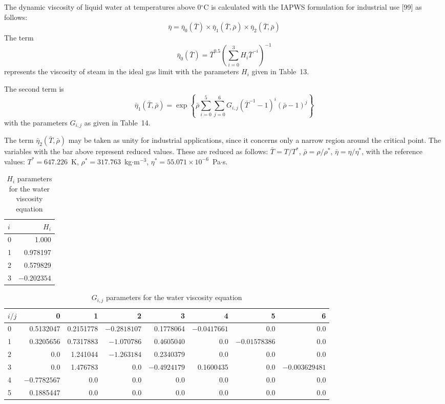 \documentclass[11pt]{article}
\begin{document}
The dynamic viscosity of liquid water at temperatures above 0$^{\circ}$C is calculated
with the IAPWS formulation for industrial use [99] as follows:
\begin{equation}
\bar{\eta} = \bar{\eta}_0(\bar{T}) \times \bar{\eta}_1(\bar{T}, \bar{\rho}) \times
\bar{\eta}_2(\bar{T}, \bar{\rho})
\end{equation}
The term
\begin{equation}
\bar{\eta}_0(\bar{T}) = \bar{T}^{0.5} \left(\sum_{i=0}^{3} H_i \bar{T}^{-i}\right)^{-1}
\end{equation}
represents the viscosity of steam in the ideal gas limit with the parameters $H_i$ given
in Table~13.

The second term is
\begin{equation}
\bar{\eta}_1(\bar{T}, \bar{\rho}) = \exp\left\{\bar{\rho} \sum_{i=0}^{5} \sum_{j=0}^{6}
G_{i,j} \left(\bar{T}^{-1} - 1\right)^i (\bar{\rho} - 1)^j\right\}
\end{equation}
with the parameters $G_{i,j}$ as given in Table~14.

The term $\bar{\eta}_2(\bar{T}, \bar{\rho})$ may be taken as unity for industrial
applications, since it concerns only a narrow region around the critical point. The
variables with the bar above represent reduced values. These are reduced as follows:
$\bar{T} = T/T^*$, $\bar{\rho} = \rho/\rho^*$, $\bar{\eta} = \eta/\eta^*$, with the
reference values: $T^* = 647.226$~K, $\rho^* = 317.763$~kg$\cdot$m$^{-3}$,
$\eta^* = 55.071 \times 10^{-6}$~Pa$\cdot$s.

\begin{table}[htbp]
\centering
\caption{$H_i$ parameters for the water viscosity equation}
\begin{tabular}{lr}
\toprule
$i$ & $H_i$ \\
\midrule
0 & 1.000 \\
1 & 0.978197 \\
2 & 0.579829 \\
3 & $-0.202354$ \\
\bottomrule
\end{tabular}
\end{table}

\begin{table}[htbp]
\centering
\caption{$G_{i,j}$ parameters for the water viscosity equation}
\begin{tabular}{lrrrrrrr}
\toprule
$i/j$ & 0 & 1 & 2 & 3 & 4 & 5 & 6 \\
\midrule
0 & 0.5132047 & 0.2151778 & $-0.2818107$ & 0.1778064 & $-0.0417661$ & 0.0 & 0.0 \\
1 & 0.3205656 & 0.7317883 & $-1.070786$ & 0.4605040 & 0.0 & $-0.01578386$ & 0.0 \\
2 & 0.0 & 1.241044 & $-1.263184$ & 0.2340379 & 0.0 & 0.0 & 0.0 \\
3 & 0.0 & 1.476783 & 0.0 & $-0.4924179$ & 0.1600435 & 0.0 & $-0.003629481$ \\
4 & $-0.7782567$ & 0.0 & 0.0 & 0.0 & 0.0 & 0.0 & 0.0 \\
5 & 0.1885447 & 0.0 & 0.0 & 0.0 & 0.0 & 0.0 & 0.0 \\
\bottomrule
\end{tabular}
\end{table}
\end{document}
